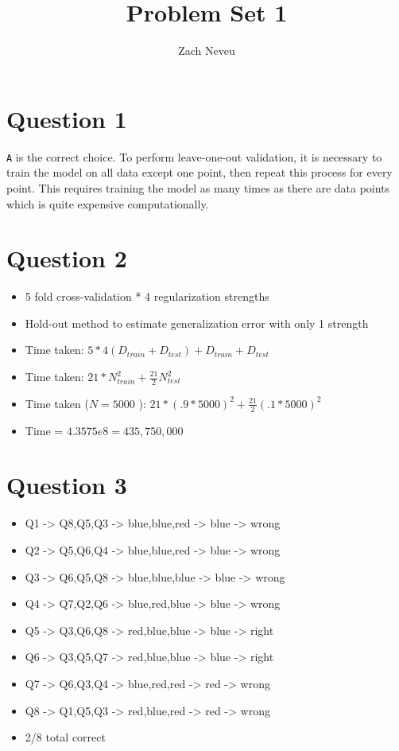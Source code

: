 \documentclass[12pt, letter]{article}
\author{Zach Neveu}
\title{ Problem Set 1 }
\begin{document}
\maketitle

\section{Question 1}%
\label{sec:questions}
\texttt{A}  is the correct choice. To perform leave-one-out validation, it is necessary to train the model on all data except one point, then repeat this process for every point. This requires training the model as many times as there are data points which is quite expensive computationally.

\section{Question 2}%
\label{sec:question_2}
\begin{itemize}
	\item 5 fold cross-validation * 4 regularization strengths 
	\item Hold-out method to estimate generalization error with only 1 strength
	\item Time taken: $5*4(D_{train}+D_{test})+D_{train}+D_{test}$
	\item Time taken: $21*N_{train}^2+\frac{21}{2}N_{test}^2$
	\item Time taken ($N=5000$ ): $21*(.9*5000)^2+\frac{21}{2}(.1*5000)^2$
	\item Time = $4.3575e8 = 435,750,000$
\end{itemize}

\section{Question 3}%
\label{sec:question_3}
\begin{itemize}
	\item Q1 -> Q8,Q5,Q3 -> blue,blue,red -> blue -> wrong
	\item Q2 -> Q5,Q6,Q4 -> blue,blue,red -> blue -> wrong
	\item Q3 -> Q6,Q5,Q8 -> blue,blue,blue -> blue -> wrong
	\item Q4 -> Q7,Q2,Q6 -> blue,red,blue -> blue -> wrong
	\item Q5 -> Q3,Q6,Q8 -> red,blue,blue -> blue -> right
	\item Q6 -> Q3,Q5,Q7 -> red,blue,blue -> blue -> right
	\item Q7 -> Q6,Q3,Q4 -> blue,red,red -> red -> wrong
	\item Q8 -> Q1,Q5,Q3 -> red,blue,red -> red -> wrong
	\item 2/8 total correct
\end{itemize}
\end{document}
